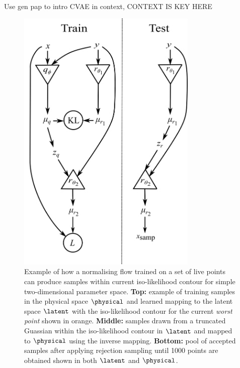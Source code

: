 \documentclass[aps,superscriptaddress,twocolumn,nopreprintnumbers,floatfix,groupedaddress]{revtex4-1}
\newcommand{\figwidth}{8.6cm}
\begin{document}

Use gen pap to intro CVAE in context, CONTEXT IS KEY HERE


\begin{figure}
	\centering
	\includegraphics[width=\figwidth]{figs/network_setup.png}
	\caption{Example of how a normalising flow trained on a set of live points can produce samples within current iso-likelihood contour for simple two-dimensional parameter space. \textbf{Top:} example of training samples in the physical space $\physical$ and learned mapping to the latent space $\latent$ with the iso-likelihood contour for the current \textit{worst point} shown in orange. \textbf{Middle:} samples drawn from a truncated Guassian within the iso-likelihood contour in $\latent$ and mapped to $\physical$ using the inverse mapping. \textbf{Bottom:} pool of accepted samples after applying rejection sampling until 1000 points are obtained shown in both $\latent$ and $\physical$.}
	\label{fig:vit_flow}
\end{figure}
\end{document}
